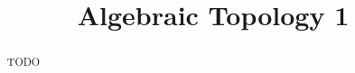 \documentclass[11pt, letterpaper]{report}
\title{Algebraic Topology 1}
\begin{document}
    \maketitle
    \tableofcontents

    \begin{abstract}
	    TODO
    \end{abstract}
    
    
    
    
    
    
\end{document}
